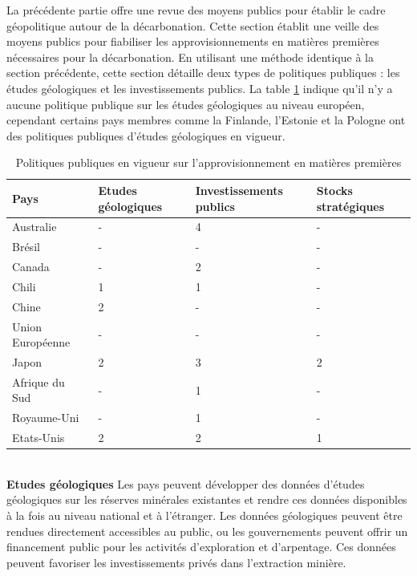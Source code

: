 La précédente partie offre une revue des moyens publics pour établir le cadre géopolitique autour de la décarbonation. Cette section établit une veille des moyens publics pour fiabiliser les approvisionnements en matières premières nécessaires pour la décarbonation. En utilisant une méthode identique à la section précédente, cette section détaille deux types de politiques publiques : les études géologiques et les investissements publics. La table \ref{tab:approvisionnement} indique qu'il n'y a aucune politique publique sur les études géologiques au niveau européen, cependant certains pays membres comme la Finlande, l'Estonie et la Pologne ont des politiques publiques d'études géologiques en vigueur.\\
\begin{table}[!h]
\centering
\begin{tabular}{ |p{3cm}||p{3.6cm}|p{3.6cm}|p{3.6cm}|  }
 \hline
 Pays & Etudes géologiques & Investissements publics & Stocks stratégiques\\
 \hline
 Australie          & -     & 4 & - \\
 Brésil             & -     & - & - \\
 Canada             & -     & 2 & - \\
 Chili              & 1     & 1 & - \\
 Chine              & 2     & - & - \\
 Union Européenne   & -     & - & - \\
 Japon              & 2     & 3 & 2 \\
 Afrique du Sud     & -     & 1 & - \\
 Royaume-Uni        & -     & 1 & - \\
 Etats-Unis         & 2     & 2 & 1 \\
 \hline
\end{tabular}
    \caption{Politiques publiques en vigueur sur l'approvisionnement en matières premières}
    \label{tab:approvisionnement}
\end{table}
~\\
\textbf{Etudes géologiques}\smallbreak
Les pays peuvent développer des données d'études géologiques sur les réserves minérales existantes et rendre ces données disponibles à la fois au niveau national et à l'étranger. Les données géologiques peuvent être rendues directement accessibles au public, ou les gouvernements peuvent offrir un financement public pour les activités d'exploration et d'arpentage. Ces données peuvent favoriser les investissements privés dans l'extraction minière.\smallbreak
